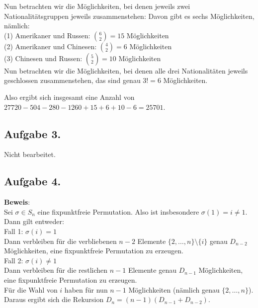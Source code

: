 \documentclass[11pt,a4paper,ngerman]{article}
\begin{document}
Nun betrachten wir die Möglichkeiten, bei denen jeweils zwei Nationalitätsgruppen jeweils zusammenstehen:
Davon gibt es sechs Möglichkeiten, nämlich: \\
(1) Amerikaner und Russen: $\binom{6}{2} = 15 $ Möglichkeiten \\
(2) Amerikaner und Chinesen: $\binom{4}{2} = 6$ Möglichkeiten \\
(3) Chinesen und Russen: $\binom{5}{2} = 10$ Möglichkeiten \\

Nun betrachten wir die Möglichkeiten, bei denen alle drei Nationalitäten jeweils geschlossen zusammenstehen, das sind genau $3! = 6$ Möglichkeiten.

Also ergibt sich insgesamt eine Anzahl von $27 720 - 504 - 280 - 1260 +15 + 6+ 10 - 6 = 25701$.
\subsection*{Aufgabe 3.}
Nicht bearbeitet.
\subsection*{Aufgabe 4.}
\textbf{Beweis}: \\
Sei $\sigma \in S_{n}$ eine fixpunktfreie Permutation. Also ist insbesondere $\sigma(1) = i \neq 1$.
Dann gilt entweder: \\
Fall 1: $\sigma(i) = 1$ \\
Dann verbleiben für die verbliebenen $n-2$ Elemente $\{ 2,\ldots,n \} \setminus \{i \}$ genau $D_{n-2}$ Möglichkeiten, eine fixpunktfreie Permutation zu erzeugen. \\
Fall 2: $\sigma(i) \neq 1$ \\
Dann verbleiben für die restlichen $n-1$ Elemente genau $D_{n-1}$ Möglichkeiten, eine fixpunktfreie Permutation zu erzeugen.\\

Für die Wahl von $i$ haben für nun $n-1$ Möglichkeiten (nämlich genau $\{2,\ldots,n \}$). Daraus ergibt sich die Rekursion $D_n = (n-1) (D_{n-1} + D_{n-2})$.
\end{document}
